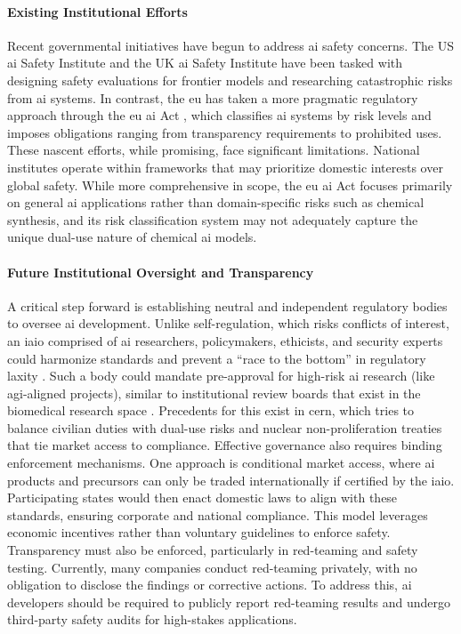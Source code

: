 \paragraph{Existing Institutional Efforts} Recent governmental initiatives have begun to address \gls{ai} safety concerns. 
The US \gls{ai} Safety Institute \autocite{nist2024safety} and the UK \gls{ai} Safety Institute have been tasked with designing safety evaluations for frontier models and researching catastrophic risks from \gls{ai} systems. 
In contrast, the \gls{eu} has taken a more pragmatic regulatory approach through the \gls{eu} \gls{ai} Act \autocite{EU2024regulation}, which classifies \gls{ai} systems by risk levels and imposes obligations ranging from transparency requirements to prohibited uses. 
These nascent efforts, while promising, face significant limitations. 
National institutes operate within frameworks that may prioritize domestic interests over global safety. 
While more comprehensive in scope, the \gls{eu} \gls{ai} Act focuses primarily on general \gls{ai} applications rather than domain-specific risks such as chemical synthesis, and its risk classification system may not adequately capture the unique dual-use nature of chemical \gls{ai} models.

\paragraph{Future Institutional Oversight and Transparency} A critical step forward is establishing neutral and independent regulatory bodies to oversee \gls{ai} development. 
Unlike self-regulation, which risks conflicts of interest, an \gls{iaio} comprised of \gls{ai} researchers, policymakers, ethicists, and security experts could harmonize standards and prevent a \enquote{race to the bottom} in regulatory laxity \autocite{trager2023international}. Such a body could mandate pre-approval for high-risk \gls{ai} research (like \gls{agi}-aligned projects), similar to institutional review boards that exist in the biomedical research space \autocite{pistono2016unethical}. Precedents for this exist in \gls{cern}, which tries to balance civilian duties with dual-use risks and nuclear non-proliferation treaties that tie market access to compliance.\autocite{cern_nuclear_safeguards_2024} 
Effective governance also requires binding enforcement mechanisms. 
One approach is conditional market access, where \gls{ai} products and precursors can only be traded internationally if certified by the \gls{iaio}. 
Participating states would then enact domestic laws to align with these standards, ensuring corporate and national compliance. 
This model leverages economic incentives rather than voluntary guidelines to enforce safety. Transparency must also be enforced, particularly in red-teaming and safety testing. 
Currently, many companies conduct red-teaming privately, with no obligation to disclose the findings or corrective actions.
To address this, \gls{ai} developers should be required to publicly report red-teaming results and undergo third-party safety audits for high-stakes applications.\autocite{carlini2025career}

